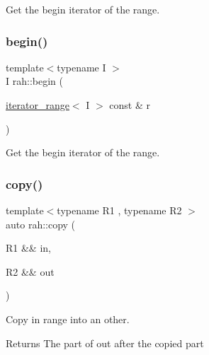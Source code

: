 Get the begin iterator of the range. 

\mbox{\label{namespacerah_a14e69321e6772651b349cb31467ea3a2}} 
\subsubsection{\texorpdfstring{begin()}{begin()}\hspace{0.1cm}{\footnotesize\ttfamily [2/2]}}
{\footnotesize\ttfamily template$<$typename I $>$ \\
I rah\+::begin (\begin{DoxyParamCaption}\item[{\mbox{\hyperlink{structrah_1_1iterator__range}{iterator\+\_\+range}}$<$ I $>$ const \&}]{r }\end{DoxyParamCaption})}



Get the begin iterator of the range. 

\mbox{\label{namespacerah_a1d0f36ff683cedc9090956ea389b3312}} 
\subsubsection{\texorpdfstring{copy()}{copy()}}
{\footnotesize\ttfamily template$<$typename R1 , typename R2 $>$ \\
auto rah\+::copy (\begin{DoxyParamCaption}\item[{R1 \&\&}]{in,  }\item[{R2 \&\&}]{out }\end{DoxyParamCaption})}



Copy in range into an other. 

\begin{DoxyReturn}{Returns}
The part of out after the copied part
\end{DoxyReturn}

\begin{DoxyCodeInclude}{0}
\end{DoxyCodeInclude}
\mbox{\label{namespacerah_ad9c29fa208b4ab8bfb9c226a1f82b9a1}} 
